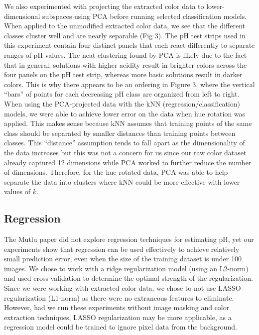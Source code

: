 \documentclass[journal]{IEEEtran}
\begin{document}
We also experimented with projecting the extracted color data to lower-dimensional subspaces using PCA before running selected classification models. When applied to the unmodified extracted color data, we see that the different classes cluster well and are nearly separable (Fig 3). The pH test strips used in this experiment contain four distinct panels that each react differently to separate ranges of pH values. The neat clustering found by PCA is likely due to the fact that in general, solutions with higher acidity result in brighter colors across the four panels on the pH test strip, whereas more basic solutions result in darker colors. This is why there appears to be an ordering in Figure 3, where the vertical “bars” of points for each decreasing pH class are organized from left to right. When using the PCA-projected data with the kNN (regression/classification) models, we were able to achieve lower error on the data when hue rotation was applied. This makes sense because kNN assumes that training points of the same class should be separated by smaller distances than training points between classes. This “distance” assumption tends to fall apart as the dimensionality of the data increases but this was not a concern for us since our raw color dataset already captured 12 dimensions while PCA worked to further reduce the number of dimensions. Therefore, for the hue-rotated data, PCA was able to help separate the data into clusters where kNN could be more effective with lower values of $k$. 

\subsection{Regression}
The Mutlu paper did not explore regression techniques for estimating pH, yet our experiments show that regression can be used effectively to achieve relatively small prediction error, even when the size of the training dataset is under 100 images. We chose to work with a ridge regularization model (using an L2-norm) and used cross validation to determine the optimal strength of the regularization. Since we were working with extracted color data, we chose to not use LASSO regularization (L1-norm) as there were no extraneous features to eliminate. However, had we run these experiments without image masking and color extraction techniques, LASSO regularization may be more applicable, as a regression model could be trained to ignore pixel data from the background.
\end{document}
